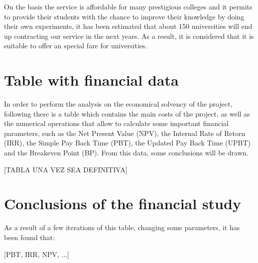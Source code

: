 \newline
\newline
On the basis the service is affordable for many prestigious colleges and it permits to provide their students with the chance to improve their knowledge by doing their own experiments, it has been estimated that about 150 universities will end up contracting our service in the next years. As a result, it is considered that it is suitable to offer an special fare for universities.


\section{Table with financial data}

In order to perform the analysis on the economical solvency of the project, following there is a table which contains the main costs of the project, as well as the numerical operations that allow to calculate some important financial parameters, such as the Net Present Value (NPV), the Internal Rate of Retorn (IRR), the Simple Pay Back Time (PBT), the Updated Pay Back Time (UPBT) and the Breakeven Point (BP). From this data, some conclusions will be drawn.

[TABLA UNA VEZ SEA DEFINITIVA]

\section{Conclusions of the financial study}
As a result of a few iterations of this table, changing some parameters, it has been found that:

[PBT, IRR, NPV, ...]









